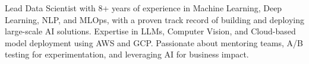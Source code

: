 

\begin{cvparagraph}

Lead Data Scientist with 8+ years of experience in Machine Learning, Deep Learning, NLP, and MLOps, 
with a proven track record of building and deploying large-scale AI solutions. Expertise in LLMs, Computer Vision, 
and Cloud-based model deployment using AWS and GCP. Passionate about mentoring teams, A/B testing for experimentation, 
and leveraging AI for business impact.
\end{cvparagraph}
